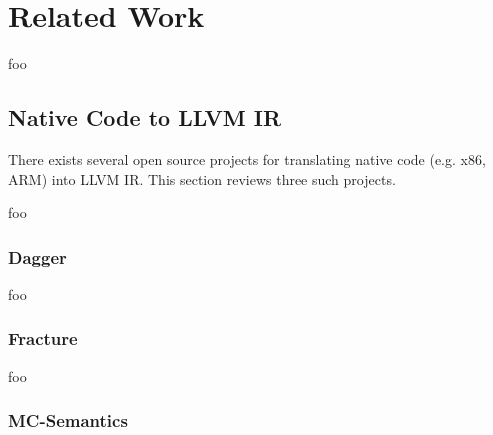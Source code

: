 

\section{Related Work}
\label{sec:related_work}

foo


\subsection{Native Code to LLVM IR}

There exists several open source projects for translating native code (e.g. x86, ARM) into LLVM IR. This section reviews three such projects.

foo


\subsubsection{Dagger}


foo


\subsubsection{Fracture}


foo


\subsubsection{MC-Semantics}


